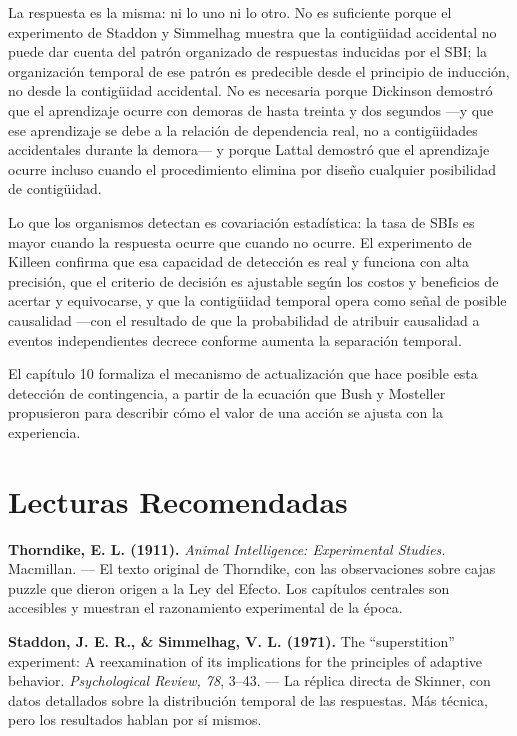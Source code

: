 \documentclass[
  letterpaper,
  DIV=11,
  numbers=noendperiod]{scrreprt}
\begin{document}
\begin{tcolorbox}[enhanced jigsaw, toprule=.15mm, arc=.35mm, colback=white, opacityback=0, colframe=quarto-callout-note-color-frame, breakable, rightrule=.15mm, left=2mm, leftrule=.75mm, bottomrule=.15mm]
La respuesta es la misma: ni lo uno ni lo otro. No es suficiente porque
el experimento de Staddon y Simmelhag muestra que la contigüidad
accidental no puede dar cuenta del patrón organizado de respuestas
inducidas por el SBI; la organización temporal de ese patrón es
predecible desde el principio de inducción, no desde la contigüidad
accidental. No es necesaria porque Dickinson demostró que el aprendizaje
ocurre con demoras de hasta treinta y dos segundos ---y que ese
aprendizaje se debe a la relación de dependencia real, no a
contigüidades accidentales durante la demora--- y porque Lattal demostró
que el aprendizaje ocurre incluso cuando el procedimiento elimina por
diseño cualquier posibilidad de contigüidad.

Lo que los organismos detectan es covariación estadística: la tasa de
SBIs es mayor cuando la respuesta ocurre que cuando no ocurre. El
experimento de Killeen confirma que esa capacidad de detección es real y
funciona con alta precisión, que el criterio de decisión es ajustable
según los costos y beneficios de acertar y equivocarse, y que la
contigüidad temporal opera como señal de posible causalidad ---con el
resultado de que la probabilidad de atribuir causalidad a eventos
independientes decrece conforme aumenta la separación temporal.

El capítulo 10 formaliza el mecanismo de actualización que hace posible
esta detección de contingencia, a partir de la ecuación que Bush y
Mosteller propusieron para describir cómo el valor de una acción se
ajusta con la experiencia.

\section{Lecturas Recomendadas}\label{lecturas-recomendadas-1}

\textbf{Thorndike, E. L. (1911).} \emph{Animal Intelligence:
Experimental Studies.} Macmillan. --- El texto original de Thorndike,
con las observaciones sobre cajas puzzle que dieron origen a la Ley del
Efecto. Los capítulos centrales son accesibles y muestran el
razonamiento experimental de la época.

\textbf{Staddon, J. E. R., \& Simmelhag, V. L. (1971).} The
``superstition'' experiment: A reexamination of its implications for the
principles of adaptive behavior. \emph{Psychological Review, 78}, 3--43.
--- La réplica directa de Skinner, con datos detallados sobre la
distribución temporal de las respuestas. Más técnica, pero los
resultados hablan por sí mismos.


\end{tcolorbox}
\end{document}
